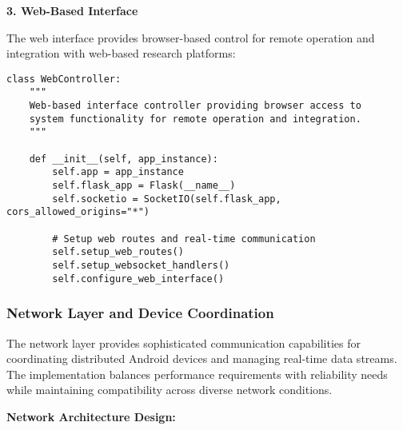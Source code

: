 \documentclass[11pt,a4paper]{article}
\begin{document}
\textbf{3. Web-Based Interface}

The web interface provides browser-based control for remote operation and integration with web-based research platforms:

\begin{verbatim}
class WebController:
    """
    Web-based interface controller providing browser access to
    system functionality for remote operation and integration.
    """

    def __init__(self, app_instance):
        self.app = app_instance
        self.flask_app = Flask(__name__)
        self.socketio = SocketIO(self.flask_app, cors_allowed_origins="*")

        # Setup web routes and real-time communication
        self.setup_web_routes()
        self.setup_websocket_handlers()
        self.configure_web_interface()
\end{verbatim}

\subsubsection{Network Layer and Device Coordination}

The network layer provides sophisticated communication capabilities for coordinating distributed Android devices and
managing real-time data streams. The implementation balances performance requirements with reliability needs while
maintaining compatibility across diverse network conditions.

\textbf{Network Architecture Design:}
\end{document}
